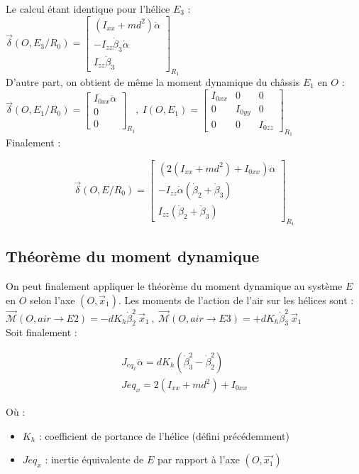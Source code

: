 \documentclass[10pt,a4paper]{article}
\begin{document}
Le calcul étant identique pour l'hélice $E_{3}$ : \\
$
\vec{\delta}(O,E_{3}/R_{0}) =
\begin{bmatrix}
(I_{xx} + m d^2) \ddot \alpha \\
- I_{zz} \dot \beta_{3} \dot \alpha \\
I_{zz} \ddot \beta_{3}
\end{bmatrix} _{R_{1}}
$ \\

D'autre part, on obtient de même la moment dynamique du châssis $E_{1}$ en $O$ : \\
$
\vec{\delta}(O,E_{1}/R_{0}) =
\begin{bmatrix}
I_{0xx} \ddot \alpha \\
0 \\
0
\end{bmatrix} _{R_{1}}
, \ 
I(O,E_{1}) = 
\begin{bmatrix}
I_{0xx} & 0 & 0 \\
0 & I_{0yy} & 0 \\
0 & 0 & I_{0zz}
\end{bmatrix} _{R_{1}}
$ \\

Finalement :

\begin{equation}
\vec{\delta}(O,E/R_{0}) =
\begin{bmatrix}
( 2 (I_{xx} + m d^2) + I_{0xx}) \ddot \alpha \\
- I_{zz} \dot \alpha ( \dot \beta_{2} + \dot \beta_{3} ) \\
I_{zz} ( \ddot \beta_{2} + \ddot \beta_{3} )
\end{bmatrix} _{R_{1}}
\end{equation}

\subsection{Théorème du moment dynamique}
On peut finalement appliquer le théorème du moment dynamique au système $E$ en $O$ selon l'axe $(O,\vec{x}_{1})$. Les moments de l'action de l'air sur les hélices sont : \\
$
\vec{\mathcal{M}}(O,air \rightarrow E2) = - d K_{h} \dot \beta_{2}^2 \  \vec{x}_{1}
\ , \  
\vec{\mathcal{M}}(O,air \rightarrow E3) = + d K_{h} \dot \beta_{3}^2 \  \vec{x}_{1}
$ \\
Soit finalement : 

\begin{eqnarray}
J_{eq_{x}} \ddot \alpha = d K_{h} (\dot \beta_{3}^2 - \dot \beta_{2}^2 ) \\
Jeq_{x}= 2 (I_{xx} + m d^2) + I_{0xx}
\end{eqnarray}



Où :
\begin{itemize}
\item $K_{h}$ : coefficient de portance de l'hélice (défini précédemment)
\item $Jeq_{x}$ : inertie équivalente de $E$ par rapport à l'axe $(O,\vec{x_{1}})$
\end{itemize}
\end{document}
